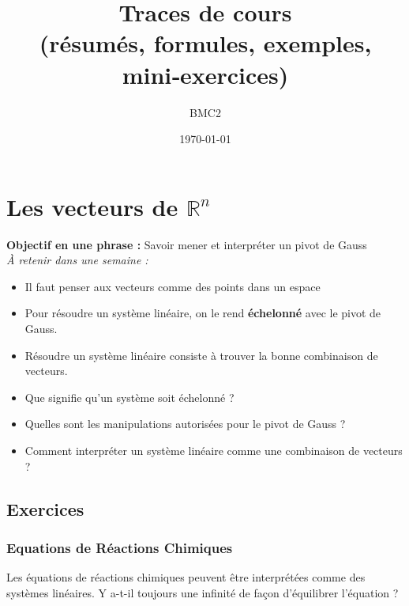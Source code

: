 \documentclass[11pt,a4paper]{report}
\title{\textbf{Traces de cours}\\\large (résumés, formules, exemples, mini‑exercices)}
\author{ BMC2 }
\date{\today}
\newenvironment{niceitemize}{\begin{itemize}\setlength{\itemsep}{0.25em}\color{Gray}}{\end{itemize}}
\begin{document}
\tableofcontents
\clearpage


\chapter{Les vecteurs de $\mathbb{R}^n$}

  \begin{resumeBox}
    \textbf{Objectif en une phrase :} Savoir mener et interpréter un pivot de Gauss\\[0.25em]
    \emph{À retenir dans une semaine :} 
    \begin{niceitemize}
      \item Il faut penser aux vecteurs comme des points dans un espace
      \item Pour résoudre un système linéaire, on le rend \textbf{échelonné} avec le pivot de Gauss.
      \item Résoudre un système linéaire consiste à trouver la bonne combinaison de vecteurs. 
    \end{niceitemize}
  \end{resumeBox}
  \begin{rappelsBox}
    \begin{niceitemize}
      \item Que signifie qu'un système soit échelonné ?
      \item Quelles sont les manipulations autorisées pour le pivot de Gauss ?
      \item Comment interpréter un système linéaire comme une combinaison de vecteurs ?
    \end{niceitemize}
  \end{rappelsBox}

    \section{Exercices}
    \subsection{Equations de Réactions Chimiques}
    Les équations de réactions chimiques peuvent être interprétées comme des systèmes linéaires. Y a-t-il toujours une infinité de façon d'équilibrer l'équation ?
    
\end{document}
